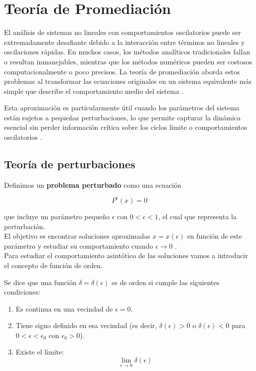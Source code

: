\chapter{Teoría de Promediación}

El análisis de sistemas no lineales con comportamientos oscilatorios puede ser extremadamente desafiante debido a la interacción entre términos no lineales y oscilaciones rápidas. En muchos casos, los métodos analíticos tradicionales fallan o resultan inmanejables, mientras que los métodos numéricos pueden ser costosos computacionalmente o poco precisos. La teoría de promediación aborda estos problemas al transformar las ecuaciones originales en un sistema equivalente más simple que describe el comportamiento medio del sistema \cite{hinch1991perturbation}.

Esta aproximación es particularmente útil cuando los parámetros del sistema están sujetos a pequeñas perturbaciones, lo que permite capturar la dinámica esencial sin perder información crítica sobre los ciclos límite o comportamientos oscilatorios \cite{bender2013advanced}.

\section{Teoría de perturbaciones}

Definimos un \textbf{problema perturbado} como una ecuación 

\begin{equation}\label{eq: problemaPerturbado}
	P^\epsilon\left(x\right)=0
\end{equation}

que incluye un parámetro pequeño $\epsilon$ con $0<\epsilon<1$, el cual que representa la perturbación.\\

El objetivo es encontrar soluciones aproximadas $x=x\left(\epsilon\right)$ en función de este parámetro y estudiar su comportamiento cuando $\epsilon\to0$ \cite{hinch1991perturbation}.\\

Para estudiar el comportamiento asintótico de las soluciones vamos a introducir el concepto de función de orden.

\begin{definition}
	Se dice que una función $\delta=\delta\left(\epsilon\right)$ es de orden si cumple las siguientes condiciones:
	\begin{enumerate}
		\item Es continua en una vecindad de $\epsilon=0$.
		\item Tiene signo definido en esa vecindad (es decir, $\delta(\epsilon)>0$ o $\delta(\epsilon)<0$ para $0<\epsilon<\epsilon_0$ con $\epsilon_0>0$).
		\item Existe el límite:
		$$\displaystyle\lim_{\epsilon\to0}\delta\left(\epsilon\right)$$
	\end{enumerate}
\end{definition}

